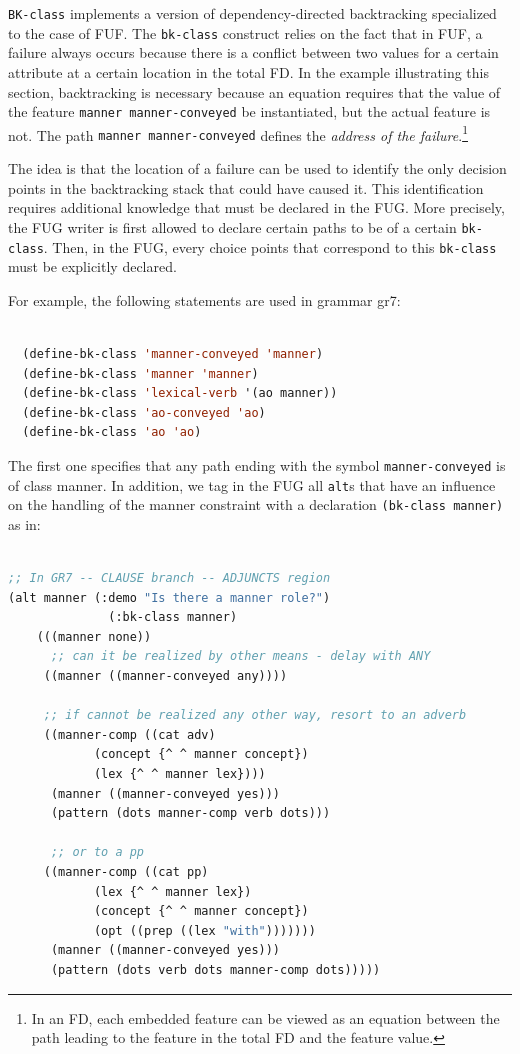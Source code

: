 \documentclass[10pt,a4paper]{report}
\begin{document}
{\tt BK-class} implements a version of dependency-directed backtracking
\cite{doyle} specialized to the case of FUF.  The {\tt bk-class}
construct relies on the fact that in FUF, a failure always occurs
because there is a conflict between two values for a certain attribute at a
certain location in the total FD.  In the example illustrating this
section, backtracking is necessary because an equation requires that the
value of the feature {\tt {manner manner-conveyed}} be instantiated, but the
actual feature is not.  The path {\tt {manner manner-conveyed}} defines the
{\em address of the failure}.\footnote{In an FD, each embedded feature can be
viewed as an equation between the path leading to the feature in the total
FD and the feature value.}

The idea is that the location of a failure can be used to identify the only
decision points in the backtracking stack that could have caused it.  This
identification requires additional knowledge that must be declared in the
\textsc{FUG}.  More precisely, the \textsc{FUG} writer is first allowed to declare
certain paths to be of a certain {\tt bk-class}.  Then, in the \textsc{FUG}, every
choice points that correspond to this {\tt bk-class} must be explicitly
declared.

For example, the following statements are used in grammar gr7:
\begin{lstlisting}[language=Lisp]

  (define-bk-class 'manner-conveyed 'manner)
  (define-bk-class 'manner 'manner)
  (define-bk-class 'lexical-verb '(ao manner))
  (define-bk-class 'ao-conveyed 'ao)
  (define-bk-class 'ao 'ao)

\end{lstlisting} 
The first one specifies that any path ending with the symbol
{\tt manner-conveyed} is of class manner.  In addition, we tag in the FUG all
{\tt alt}s that have an influence on the handling of the manner constraint
with a declaration {\tt (bk-class manner)} as in:

\begin{lstlisting}[language=Lisp]

;; In GR7 -- CLAUSE branch -- ADJUNCTS region
(alt manner (:demo "Is there a manner role?") 
			  (:bk-class manner)
	(((manner none))
	  ;; can it be realized by other means - delay with ANY
	 ((manner ((manner-conveyed any))))

	 ;; if cannot be realized any other way, resort to an adverb
	 ((manner-comp ((cat adv)
			(concept {^ ^ manner concept})
			(lex {^ ^ manner lex})))
	  (manner ((manner-conveyed yes)))
	  (pattern (dots manner-comp verb dots)))

	  ;; or to a pp
	 ((manner-comp ((cat pp)
			(lex {^ ^ manner lex})
			(concept {^ ^ manner concept})
			(opt ((prep ((lex "with")))))))
	  (manner ((manner-conveyed yes)))
	  (pattern (dots verb dots manner-comp dots)))))
\end{lstlisting}
\end{document}
